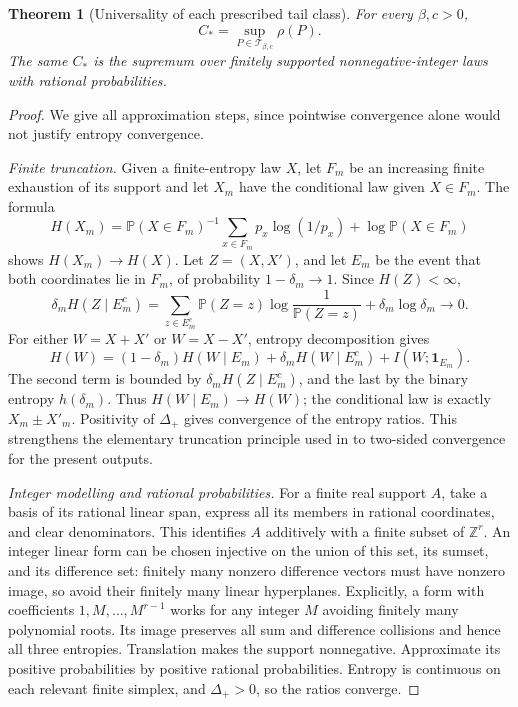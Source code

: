 \documentclass[11pt]{article}
\newtheorem{theorem}{Theorem}[section]
\theoremstyle{remark}\newtheorem{remark}[theorem]{Remark}
\newcommand{\Prob}{\mathbb P}
\newcommand{\Dplus}{\Delta_+}
\begin{document}
\begin{theorem}[Universality of each prescribed tail class]\label{thm:universal}
For every $\beta,c>0$,
\begin{equation}\label{eq:sup}
 \boxed{\ C_*=\sup_{P\in\mathcal T_{\beta,c}}\rho(P).\ }
\end{equation}
The same $C_*$ is the supremum over finitely supported nonnegative-integer
laws with rational probabilities.
\end{theorem}
\begin{proof}
We give all approximation steps, since pointwise convergence alone would
not justify entropy convergence.

\emph{Finite truncation.} Given a finite-entropy law $X$, let $F_m$ be an
increasing finite exhaustion of its support and let $X_m$ have the
conditional law given $X\in F_m$. The formula
\[
 H(X_m)=\Prob(X\in F_m)^{-1}
 \sum_{x\in F_m}p_x\log(1/p_x)+\log\Prob(X\in F_m)
\]
shows $H(X_m)\to H(X)$. Let $Z=(X,X')$, and let $E_m$ be the event that both
coordinates lie in $F_m$, of probability $1-\delta_m\to1$. Since $H(Z)<\infty$,
\[
 \delta_m H(Z\mid E_m^c)
 =\sum_{z\in E_m^c}\Prob(Z=z)\log\frac1{\Prob(Z=z)}
   +\delta_m\log\delta_m\longrightarrow0.
\]
For either $W=X+X'$ or $W=X-X'$, entropy decomposition gives
\[
 H(W)=(1-\delta_m)H(W\mid E_m)+\delta_m H(W\mid E_m^c)
       +I(W;\mathbf1_{E_m}).
\]
The second term is bounded by $\delta_m H(Z\mid E_m^c)$, and the last by
the binary entropy $h(\delta_m)$. Thus $H(W\mid E_m)\to H(W)$; the conditional
law is exactly $X_m\pm X'_m$. Positivity of $\Dplus$ gives convergence of
the entropy ratios. This strengthens the elementary truncation principle
used in \cite[Lemma 7.5]{li} to two-sided convergence for the present outputs.

\emph{Integer modelling and rational probabilities.} For a finite real
support $A$, take a basis of its rational linear span, express all its
members in rational coordinates, and clear denominators. This identifies
$A$ additively with a finite subset of $\mathbb Z^r$. An integer linear
form can be chosen injective on the union of this set, its sumset, and
its difference set: finitely many nonzero difference vectors must have
nonzero image, so avoid their finitely many linear hyperplanes. Explicitly,
a form with coefficients $1,M,\ldots,M^{r-1}$ works for any integer $M$
avoiding finitely many polynomial roots. Its image preserves all sum and
difference collisions and hence all three entropies. Translation makes
the support nonnegative. Approximate its positive probabilities by positive
rational probabilities. Entropy is continuous on each relevant finite
simplex, and $\Dplus>0$, so the ratios converge.


\end{proof}
\end{document}
